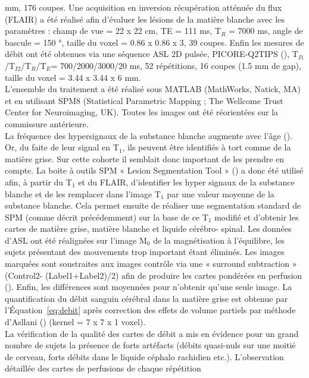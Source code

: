 mm, 176 coupes. Une acquisition en inversion récupération atténuée du flux (FLAIR) a été réalisé afin
d’évaluer les lésions de la matière blanche avec les paramètres : champ de vue = 22 x 22 cm, TE = 111
ms, T$_R$ = 7000 ms, angle de bascule = 150 °, taille du voxel = 0.86 x 0.86 x 3, 39 coupes. Enfin les mesures
de débit ont été obtenues via une séquence ASL 2D pulsée, PICORE-Q2TIPS (\cite{Luh1999}), T$_{I1}$/T$_{I2}$/T$_{R}$/T$_{E}$=
700/2000/3000/20 ms, 52 répétitions, 16 coupes (1.5 mm de gap), taille du voxel = 3.44 x 3.44 x 6 mm.\\
L’ensemble du traitement a été réalisé sous MATLAB (MathWorks, Natick, MA) et en utilisant
SPM8 (Statistical Parametric Mapping ; The Wellcome Trust Center for Neuroimaging, UK). Toutes les
images ont été réorientées sur la commissure antérieure.\\
La fréquence des hypersignaux de la substance blanche augmente avec l’âge (\cite{Awad1987}). Or, du faite
de leur signal en T$_1$, ils peuvent être identifiés à tort comme de la matière grise. Sur cette cohorte il
semblait donc important de les prendre en compte. La boite à outils SPM « Lesion Segmentation Tool »
(\cite{Schmidt2012}) a donc été utilisé afin, à partir du T$_1$ et du FLAIR, d’identifier les hyper signaux de la substance
blanche et de les remplacer dans l’image T$_1$ par une valeur moyenne de la substance blanche. Cela
permet ensuite de réaliser une segmentation standard de SPM (comme décrit précédemment) sur la
base de ce T$_1$ modifié et d’obtenir les cartes de matière grise, matière blanche et liquide cérébro-
spinal. Les données d’ASL ont été réalignées sur l’image M$_0$ de la magnétisation à l’équilibre, les sujets
présentant des mouvements trop important étant éliminés. Les images marquées sont soustraites aux
images contrôle via une « surround subtraction » (Control2- (Label1+Label2)/2) afin de produire les
cartes pondérées en perfusion (\cite{Wang2008}). Enfin, les différences sont moyennées pour n’obtenir qu’une
seule image. La quantification du débit sanguin cérébral dans la matière grise est obtenue par
l’Équation~\ref{eq:debit} après correction des effets de volume partiels par méthode d’Asllani (\cite{Asllani2008}) (kernel = 7 x
7 x 1 voxel).\\
La vérification de la qualité des cartes de débit a mis en évidence pour un grand nombre de
sujets la présence de forts artéfacts (débits quasi-nuls sur une moitié de cerveau, forts débits dans le
liquide céphalo rachidien etc.). L’observation détaillée des cartes de perfusions de chaque répétition

